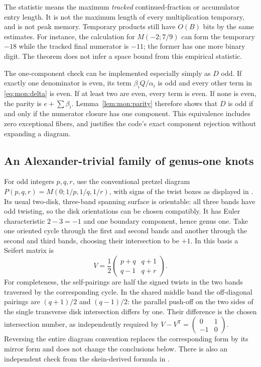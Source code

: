 \documentclass[11pt,a4paper]{article}
\theoremstyle{definition}
\theoremstyle{remark}
\newcommand{\code}[1]{\texttt{\detokenize{#1}}}
\numberwithin{equation}{section}
\begin{document}
The statistic \code{max_entry_bits} means the maximum \emph{tracked}
continued-fraction or accumulator entry length. It is not the maximum length
of every multiplication temporary, and is not peak memory. Temporary
products still have $O(B)$ bits by the same estimates.
For instance, the calculation for $M(-2;7/9)$ can form the temporary $-18$
while the tracked final numerator is $-11$; the former has one more binary
digit. The theorem does not infer a space bound from this empirical statistic.

The one-component check can be implemented especially simply as $D$ odd.
If exactly one denominator is even, its term $\beta_i Q/\alpha_i$ is odd
and every other term in \eqref{eq:mon:delta} is even. If at least two are
even, every term is even. If none is even, the parity is
$e+\sum\beta_i$. Lemma~\ref{lem:mon:parity} therefore shows that $D$ is odd
if and only if the numerator closure has one component. This equivalence
includes zero exceptional fibers, and justifies the code's exact component
rejection without expanding a diagram.

\subsection{An Alexander-trivial family of genus-one knots}

For odd integers $p,q,r$, use the conventional pretzel diagram
$P(p,q,r)=M(0;1/p,1/q,1/r)$, with signs of the twist boxes as displayed in
\cite[Figure~1 and Theorem~1(3)]{belousov-pretzel}.  Its usual two-disk,
three-band spanning surface is orientable: all three bands have odd twisting,
so the disk orientations can be chosen compatibly.  It has Euler characteristic
$2-3=-1$ and one boundary component, hence genus one.
Take one oriented cycle through the first and second bands and another through
the second and third bands, choosing their intersection to be $+1$.
In this basis a Seifert matrix is
\begin{equation}\label{eq:mon:pretzel-seifert}
 V=\frac12\begin{pmatrix}p+q&q+1\\q-1&q+r\end{pmatrix}.
\end{equation}
For completeness, the self-pairings are half the signed twists in the two
bands traversed by the corresponding cycle.  In the shared middle band the
off-diagonal pairings are $(q+1)/2$ and $(q-1)/2$: the parallel push-off on
the two sides of the single transverse disk intersection differs by one.
Their difference is the chosen intersection number, as independently required
by $V-V^{\mathsf T}=\left(\begin{smallmatrix}0&1\\-1&0\end{smallmatrix}\right)$.
Reversing the entire diagram convention replaces the corresponding form by
its mirror form and does not change the conclusions below.  There is also
an independent check from the skein-derived formula in
\cite[Theorem~1(3)]{belousov-pretzel}.
\end{document}
